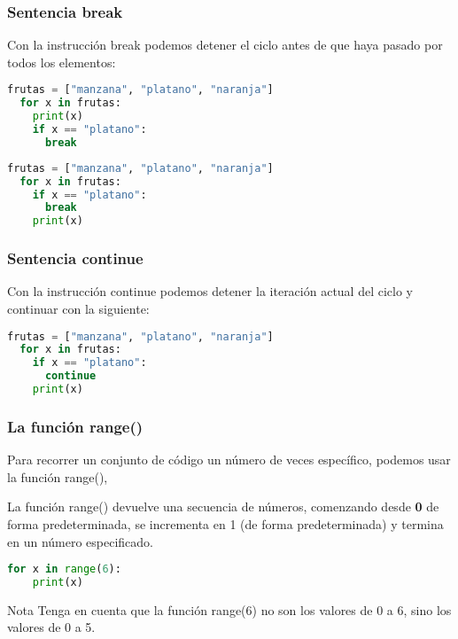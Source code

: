 \begin{frame}[fragile]
  \frametitle{Sentencia \textbf{break}}

  \vspace{\baselineskip}
  Con la instrucción \textcolor{codeKeyword}{break} podemos detener el ciclo
  antes de que haya pasado por todos los elementos:

  \vspace{\baselineskip}
  \begin{lstlisting}[language=Python]
  frutas = ["manzana", "platano", "naranja"]
  for x in frutas:
    print(x)
    if x == "platano":
      break
  \end{lstlisting}

  \pausa
  \begin{lstlisting}[language=Python]
  frutas = ["manzana", "platano", "naranja"]
  for x in frutas:
    if x == "platano":
      break
    print(x)
  \end{lstlisting}
\end{frame}

\begin{frame}[fragile]
  \frametitle{Sentencia \textbf{continue}}

  Con la instrucción \textcolor{codeKeyword}{continue} podemos detener
  la iteración actual del ciclo y continuar con la siguiente:

  \vspace{\baselineskip}
  \begin{lstlisting}[language=Python]
  frutas = ["manzana", "platano", "naranja"]
  for x in frutas:
    if x == "platano":
      continue
    print(x)
  \end{lstlisting}
\end{frame}

\begin{frame}[fragile]
  \frametitle{La función \textbf{range}()}

  Para recorrer un conjunto de código un número de veces específico,
  podemos usar la función \textcolor{codeKeyword2}{range}(),

  \vspace{\baselineskip}
  La función \textcolor{codeKeyword2}{range}() devuelve una secuencia
  de números, comenzando desde \textbf{0} de forma predeterminada,
  se incrementa en 1 (de forma predeterminada) y termina en un
  número especificado.

  \vspace{\baselineskip}
  \begin{lstlisting}[language=Python]
  for x in range(6):
    print(x)
  \end{lstlisting}

  \pausa
  \begin{alertblock}{Nota}
  Tenga en cuenta que la función range(6) no son los valores de 0 a 6,
  sino los valores de 0 a 5.
  \end{alertblock}
\end{frame}

